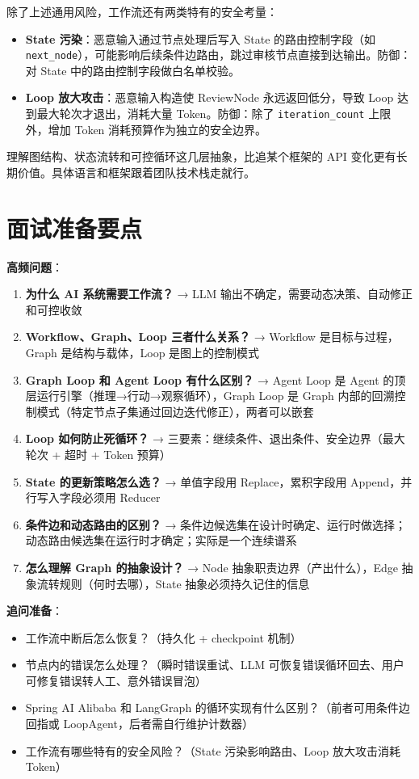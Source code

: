 \documentclass[10pt,a4paper]{ctexart}
\begin{document}
除了上述通用风险，工作流还有两类特有的安全考量：


\begin{itemize}[itemsep=2pt, topsep=4pt]
  \item \textbf{State 污染}：恶意输入通过节点处理后写入 State 的路由控制字段（如 \texttt{next\_node}），可能影响后续条件边路由，跳过审核节点直接到达输出。防御：对 State 中的路由控制字段做白名单校验。
  \item \textbf{Loop 放大攻击}：恶意输入构造使 ReviewNode 永远返回低分，导致 Loop 达到最大轮次才退出，消耗大量 Token。防御：除了 \texttt{iteration\_count} 上限外，增加 Token 消耗预算作为独立的安全边界。
\end{itemize}


理解图结构、状态流转和可控循环这几层抽象，比追某个框架的 API 变化更有长期价值。具体语言和框架跟着团队技术栈走就行。



\section{面试准备要点}


\textbf{高频问题}：


\begin{enumerate}[itemsep=2pt, topsep=4pt]
  \item \textbf{为什么 AI 系统需要工作流？} → LLM 输出不确定，需要动态决策、自动修正和可控收敛
  \item \textbf{Workflow、Graph、Loop 三者什么关系？} → Workflow 是目标与过程，Graph 是结构与载体，Loop 是图上的控制模式
  \item \textbf{Graph Loop 和 Agent Loop 有什么区别？} → Agent Loop 是 Agent 的顶层运行引擎（推理→行动→观察循环），Graph Loop 是 Graph 内部的回溯控制模式（特定节点子集通过回边迭代修正），两者可以嵌套
  \item \textbf{Loop 如何防止死循环？} → 三要素：继续条件、退出条件、安全边界（最大轮次 + 超时 + Token 预算）
  \item \textbf{State 的更新策略怎么选？} → 单值字段用 Replace，累积字段用 Append，并行写入字段必须用 Reducer
  \item \textbf{条件边和动态路由的区别？} → 条件边候选集在设计时确定、运行时做选择；动态路由候选集在运行时才确定；实际是一个连续谱系
  \item \textbf{怎么理解 Graph 的抽象设计？} → Node 抽象职责边界（产出什么），Edge 抽象流转规则（何时去哪），State 抽象必须持久记住的信息
\end{enumerate}


\textbf{追问准备}：


\begin{itemize}[itemsep=2pt, topsep=4pt]
  \item 工作流中断后怎么恢复？（持久化 + checkpoint 机制）
  \item 节点内的错误怎么处理？（瞬时错误重试、LLM 可恢复错误循环回去、用户可修复错误转人工、意外错误冒泡）
  \item Spring AI Alibaba 和 LangGraph 的循环实现有什么区别？（前者可用条件边回指或 LoopAgent，后者需自行维护计数器）
  \item 工作流有哪些特有的安全风险？（State 污染影响路由、Loop 放大攻击消耗 Token）
\end{itemize}
\end{document}
